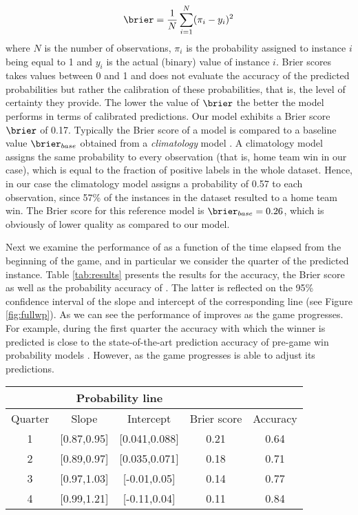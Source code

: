 \begin{equation}
\brier = \dfrac{1}{N}\sum_{i=1}^N (\pi_i-y_i)^2
\label{eq:brier}
\end{equation}
where $N$ is the number of observations, $\pi_i$ is the probability assigned to instance $i$ being equal to 1 and $y_i$ is the actual (binary) value of instance $i$.  
Brier scores takes values between 0 and 1 and does not evaluate the accuracy of the predicted probabilities but rather the calibration of these probabilities, that is, the level of certainty they provide.  %
The lower the value of $\brier$ the better the model performs in terms of calibrated predictions. 
Our model exhibits a Brier score $\brier$ of 0.17.  
Typically the Brier score of a model is compared to a baseline value $\brier_{base}$ obtained from a {\em climatology} model \cite{mason2004using}. 
A climatology model assigns the same probability to every observation (that is, home team win in our case), which is equal to the fraction of positive labels in the whole dataset.  
Hence, in our case the climatology model assigns a probability of 0.57 to each observation, since 57\% of the instances in the dataset resulted to a home team win. 
The Brier score for this reference model is $\brier_{base}=0.26$, which is obviously of lower quality as compared to our model. 

Next we examine the performance of {\method} as a function of the time elapsed from the beginning of the game, and in particular we consider the quarter of the predicted instance.  
Table \ref{tab:results} presents the results for the accuracy, the Brier score as well as the probability accuracy of {\method}. 
The latter is reflected on the 95\% confidence interval of the slope and intercept of the corresponding line (see Figure \ref{fig:fullwp}). 
As we can see the performance of {\method} improves as the game progresses. 
For example, during the first quarter the accuracy with which the winner is predicted is close to the state-of-the-art prediction accuracy of pre-game win probability models \cite{kpele-plosone}. 
However, as the game progresses {\method} is able to adjust its predictions. 

\begin{table*}
\centering
\begin{tabular}{c||*{2}{c|}c|c}
 & \multicolumn{2}{|c|}{Probability line} & & \\ \hline \hline
Quarter & Slope & Intercept & Brier score & Accuracy \\ \hline
1 & [0.87,0.95] & [0.041,0.088] & 0.21 & 0.64 \\ \hline
2 & [0.89,0.97] & [0.035,0.071] & 0.18 & 0.71 \\ \hline
3 & [0.97,1.03] & [-0.01,0.05] & 0.14 & 0.77 \\ \hline
4 & [0.99,1.21] & [-0.11,0.04] & 0.11 & 0.84 \\ \hline
\end{tabular}
\caption{The performance of our model improves as the game progresses.}
\label{tab:results}
\end{table*}

